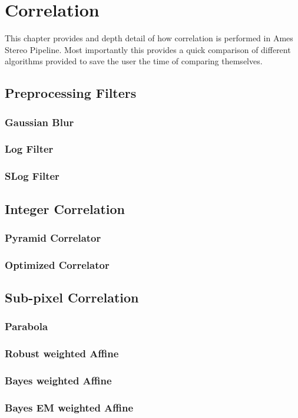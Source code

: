 \chapter{Correlation}

This chapter provides and depth detail of how correlation is performed
in Ames Stereo Pipeline. Most importantly this provides a quick
comparison of different algorithms provided to save the user the time
of comparing themselves.

\section{Preprocessing Filters}

\subsection{Gaussian Blur}

\subsection{Log Filter}

\subsection{SLog Filter}

\section{Integer Correlation}

\subsection{Pyramid Correlator}

\subsection{Optimized Correlator}

\section{Sub-pixel Correlation}

\subsection{Parabola}

\subsection{Robust weighted Affine}

\subsection{Bayes weighted Affine}

\subsection{Bayes EM weighted Affine}
